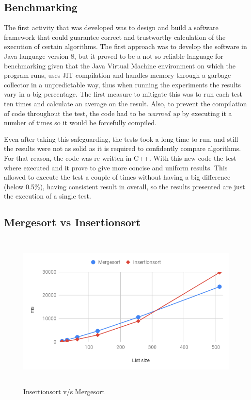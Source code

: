 \documentclass[a4paper,12pt]{article}
\begin{document}
\subsection{Benchmarking}

The first activity that was developed was to design and build a software framework that could guarantee correct and trustworthy calculation of the execution of certain algorithms. The first approach was to develop the software in Java language version 8, but it proved to be a not so reliable language for benchmarking given that the Java Virtual Machine environment on which the program runs, uses JIT  compilation and handles memory through a garbage collector in a unpredictable way, thus when running the experiments the results vary in a big percentage. The first measure to mitigate this was to run each test ten times and calculate an average on the result. Also, to prevent the compilation of code throughout the test, the code had to be {\it warmed up} by executing it a number of times so it would be forcefully compiled. 

Even after taking this safeguarding, the tests took a long time to run, and still the results were not as solid as it is required to confidently compare algorithms. For that reason, the code was re written in C++. With this new code the test where  executed and it prove to give more concise and uniform results. This allowed to execute the test a couple of times without having a big difference (below 0.5\%), having consistent result in overall, so the results presented are just the execution of a single test.

\subsection{Mergesort vs Insertionsort}

\begin{figure}[H]
    \centering
     \includegraphics[height=8cm,keepaspectratio]{./images/InsertionvsMerge.png}
    \caption{Insertionsort v/s Mergesort}
    \label{fig:InsrtVsMerge}
\end{figure}
\end{document}
